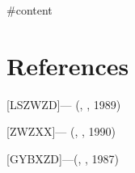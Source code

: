 \fontsize{\myFontsize}{\myLineheight}\leading{\myLineheight}\selectfont%
\setlength{\parskip}{\myLineheight}
\kwicIntroTitle
\null\newpage
\setcounter{page}{1}

#{content}


\section{References}

[LSZWZD]— (, , 1989)

[ZWZXX]— (, , 1990)

[GYBXZD]—(, , 1987)

\null\newpage
\thispagestyle{empty}

\null\newpage


